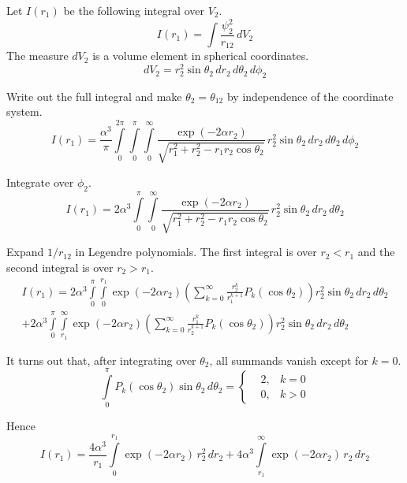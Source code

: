 Let $I(r_1)$ be the following integral over $V_2$.
\begin{equation*}
I(r_1)=\int\frac{\psi_2^2}{r_{12}}\,dV_2
\end{equation*}
The measure $dV_2$ is a volume element in spherical coordinates.
\begin{equation*}
dV_2=r_2^2\sin\theta_2\,dr_2\,d\theta_2\,d\phi_2
\end{equation*}

Write out the full integral and make $\theta_2=\theta_{12}$ by independence of the coordinate system.
\begin{equation*}
I(r_1)=\frac{\alpha^3}{\pi}
\int\limits_0^{2\pi}\int\limits_0^\pi\int\limits_0^\infty
\frac{\exp(-2\alpha r_2)}{\sqrt{r_1^2+r_2^2-r_1r_2\cos\theta_2}}
\,r_2^2\sin\theta_2\,dr_2\,d\theta_2\,d\phi_2
\end{equation*}

Integrate over $\phi_2$.
\begin{equation*}
I(r_1)=
2\alpha^3\int\limits_0^\pi\int\limits_0^\infty
\frac{\exp(-2\alpha r_2)}{\sqrt{r_1^2+r_2^2-r_1r_2\cos\theta_2}}
\,r_2^2\sin\theta_2\,dr_2\,d\theta_2
\end{equation*}

Expand $1/r_{12}$ in Legendre polynomials.
The first integral is over $r_2<r_1$ and the second integral is over $r_2>r_1$.
\begin{multline*}
I(r_1)=
2\alpha^3\int\limits_0^\pi\int\limits_0^{r_1}
\exp(-2\alpha r_2)
\left(\sum_{k=0}^\infty\frac{r_2^k}{r_1^{k+1}}P_k(\cos\theta_2)\right)
r_2^2\sin\theta_2\,dr_2\,d\theta_2
\\
+2\alpha^3\int\limits_0^\pi\int\limits_{r_1}^\infty
\exp(-2\alpha r_2)
\left(\sum_{k=0}^\infty\frac{r_1^k}{r_2^{k+1}}P_k(\cos\theta_2)\right)
r_2^2\sin\theta_2\,dr_2\,d\theta_2
\end{multline*}

It turns out that, after integrating over $\theta_2$, all summands vanish except for $k=0$.
\begin{equation*}
\int\limits_0^\pi P_k(\cos\theta_2)\sin\theta_2\,d\theta_2=
\left\{
\begin{aligned}
&2, & k=0
\\
&0, & k>0
\end{aligned}\right.
\tag{5}
\end{equation*}

Hence
\begin{equation*}
I(r_1)=
\frac{4\alpha^3}{r_1}\int\limits_0^{r_1}\exp(-2\alpha r_2)\,r_2^2\,dr_2
+4\alpha^3\int\limits_{r_1}^\infty\exp(-2\alpha r_2)\,r_2\,dr_2
\end{equation*}


